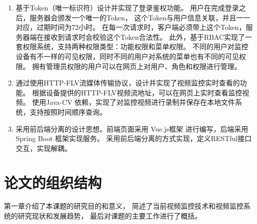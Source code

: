 \begin{enumerate}
    \item 基于Token（唯一标识符）设计并实现了登录鉴权功能\cite{周虎2019一种基于}。
    用户在完成登录之后，服务器会颁发一个唯一的Token，
    这个Token与用户信息关联，并且一一对应，过期时间为72小时。
    在每一次请求时，客户端必须带上这个Token，服务器端在接收到请求时会校验这个Token合法性。
    此外，基于RBAC实现了一套权限系统，支持两种权限类型：功能权限和菜单权限\cite{石平刚2018国铁货车检修车辅助管理系统研究与开发,周文峰2006基于}。
    不同的用户对监控设备有不一样的可见权限，同时不同的用户对系统的菜单也有不同的可见权限。
    拥有管理员权限的用户可以在网页上对用户、角色和权限进行管理。

    \item 通过使用HTTP-FLV流媒体传输协议，设计并实现了视频监控实时查看的功能。
    根据设备提供的HTTP-FLV视频流地址，可以在网页上实时查看监控视频。
    使用Java-CV 依赖，实现了对监控视频进行录制并保存在本地文件系统，支持按照时间顺序查询。

    \item 采用前后端分离的设计思想。前端页面采用 Vue.js框架 进行编写，后端采用  Spring Boot 框架实现服务。
    采用前后端分离的方式实现，定义RESTful接口交互\cite{黄沛2018基于}，实现解耦。

    
\end{enumerate}



\section{论文的组织结构}
第一章介绍了本课题的研究目的和意义，
简述了当前视频监控技术和视频监控系统的研究现状和发展趋势，
最后对课题的主要工作进行了概括。

